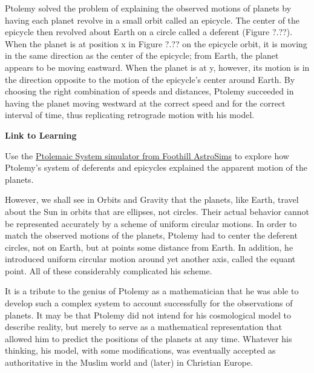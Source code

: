 \documentclass[../../main-astronomy.tex]{subfiles}
\begin{document}
\vspace{1em}

Ptolemy solved the problem of explaining the observed motions of planets by having each planet revolve in a small orbit called an \gls{epicycle}. The center of the epicycle then revolved about Earth on a circle called a deferent (Figure ?.??). When the planet is at position x in Figure ?.?? on the epicycle orbit, it is moving in the same direction as the center of the epicycle; from Earth, the planet appears to be moving eastward. When the planet is at y, however, its motion is in the direction opposite to the motion of the epicycle's center around Earth. By choosing the right combination of speeds and distances, Ptolemy succeeded in having the planet moving westward at the correct speed and for the correct interval of time, thus replicating retrograde motion with his model.

\vspace{1em}


\begin{mdframed}[backgroundcolor=black!10]
    \textbf{Link to Learning}

    \vspace{1ex}

    Use the \href{https://openstax.org/l/30ptolemaic}{Ptolemaic System simulator from Foothill AstroSims} to explore how Ptolemy's system of deferents and epicycles explained the apparent motion of the planets.
\end{mdframed}

\vspace{1em}

However, we shall see in Orbits and Gravity that the planets, like Earth, travel about the Sun in orbits that are ellipses, not circles. Their actual behavior cannot be represented accurately by a scheme of uniform circular motions. In order to match the observed motions of the planets, Ptolemy had to center the deferent circles, not on Earth, but at points some distance from Earth. In addition, he introduced uniform circular motion around yet another axis, called the equant point. All of these considerably complicated his scheme.

\vspace{1em}

It is a tribute to the genius of Ptolemy as a mathematician that he was able to develop such a complex system to account successfully for the observations of planets. It may be that Ptolemy did not intend for his cosmological model to describe reality, but merely to serve as a mathematical representation that allowed him to predict the positions of the planets at any time. Whatever his thinking, his model, with some modifications, was eventually accepted as authoritative in the Muslim world and (later) in Christian Europe.
\end{document}
